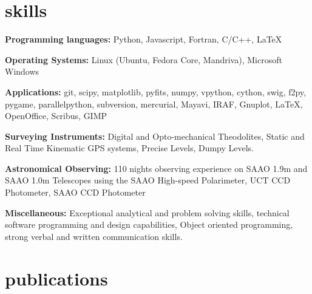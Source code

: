 \documentclass[]{friggeri-cv} %
\begin{document}

\section{skills}

\textbf{Programming languages:} Python, Javascript, Fortran, C/C++, \LaTeX 

\textbf{Operating Systems:} Linux (Ubuntu, Fedora Core, Mandriva), Microsoft Windows 

\textbf{Applications:} git, scipy, matplotlib, pyfits, numpy, vpython, cython, swig, f2py, pygame, parallelpython, subversion, mercurial, Mayavi, IRAF, Gnuplot, \LaTeX, OpenOffice, Scribus, GIMP

\textbf{Surveying Instruments:} Digital and Opto-mechanical Theodolites, Static and Real Time Kinematic GPS
    systems, Precise Levels, Dumpy Levels.
    
\textbf{Astronomical Observing:} 110 nights observing experience on SAAO 1.9m and SAAO 1.0m Telescopes using
     the SAAO High-speed Polarimeter, UCT CCD Photometer, SAAO CCD Photometer

\textbf{Miscellaneous:} Exceptional analytical and problem solving skills, technical software programming and design capabilities, Object oriented programming, strong verbal and written communication skills.



\begin{entrylist}
\end{entrylist}

\pagebreak
\section{publications}



\begin{refsection} %
\end{refsection}
%
\end{document}
